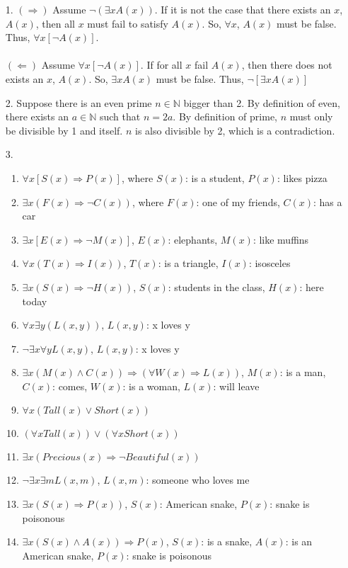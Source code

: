 \documentclass[11pt]{exam}
\author{@dantevangelista}
\begin{document}

\begin{enumerate}[leftmargin=0pt]

\item[1.] $(\Rightarrow)$ Assume $\neg (\exists x A(x))$. If it is not the case that there exists an $x$, $A(x)$, then all $x$ must fail to satisfy $A(x)$. So, $\forall x$, $A(x)$ must be false. Thus, $\forall x [\neg A(x)]$. \\
\\
$(\Leftarrow)$ Assume $\forall x [\neg A(x)]$. If for all $x$ fail $A(x)$, then there does not exists an $x$, $A(x)$. So, $\exists x A(x)$ must be false. Thus, $\neg [\exists x A(x)]$

\item[2.] Suppose there is an even prime $n \in \mathbb{N}$ bigger than 2. By definition of even, there exists an $a \in \mathbb{N}$ such that $n = 2a$. By definition of prime, $n$ must only be divisible by 1 and itself. $n$ is also divisible by 2, which is a contradiction.

\item[3.]
\begin{enumerate}[label=(\alph*)]
    \item $\forall x [S(x) \Rightarrow P(x)]$, where $S(x)$: is a student, $P(x)$: likes pizza
    \item $\exists x (F(x) \Rightarrow \neg C(x))$, where $F(x)$: one of my friends, $C(x)$: has a car
    \item $\exists x [E(x) \Rightarrow \neg M(x)]$, $E(x)$: elephants, $M(x)$: like muffins
    \item $\forall x (T(x) \Rightarrow I(x))$, $T(x)$: is a triangle, $I(x)$: isosceles
    \item $\exists x (S(x) \Rightarrow \neg H(x))$, $S(x)$: students in the class, $H(x)$: here today
    \item $\forall x \exists y (L(x,y))$, $L(x,y)$: x loves y
    \item $\neg \exists x \forall y L(x,y)$, $L(x,y)$: x loves y
    \item $\exists x (M(x) \land C(x)) \Rightarrow (\forall W(x) \Rightarrow L(x))$, $M(x)$: is a man, $C(x)$: comes, $W(x)$: is a woman, $L(x)$: will leave
    \item $\forall x (Tall(x) \lor Short(x))$
    \item $(\forall x Tall(x)) \lor (\forall x Short(x))$
    \item $\exists x (Precious(x) \Rightarrow  \neg Beautiful(x))$
    \item $\neg \exists x \exists m L(x,m)$, $L(x,m)$: someone who loves me
    \item $\exists x (S(x) \Rightarrow P(x))$, $S(x)$: American snake, $P(x)$: snake is poisonous
    \item $\exists x (S(x) \land A(x)) \Rightarrow P(x)$, $S(x)$: is a snake, $A(x)$: is an American snake, $P(x)$: snake is poisonous
\end{enumerate}


\end{enumerate}
\end{document}
